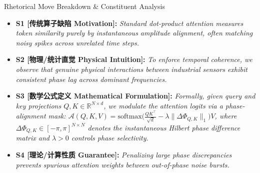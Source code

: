 \begin{TipBox}{Rhetorical Move Breakdown \& Constituent Analysis}
\begin{itemize}[leftmargin=1.5em]
  \item \textbf{S1 [传统算子缺陷 Motivation]:} \textit{Standard dot-product attention measures token similarity purely by instantaneous amplitude alignment, often matching noisy spikes across unrelated time steps.}\par{}
  \item \textbf{S2 [物理/统计直觉 Physical Intuition]:} \textit{To enforce temporal coherence, we observe that genuine physical interactions between industrial sensors exhibit consistent phase lag across dominant frequencies.}\par{}
  \item \textbf{S3 [数学公式定义 Mathematical Formulation]:} \textit{Formally, given query and key projections $Q, K \in \mathbb{R}^{N \times d}$, we modulate the attention logits via a phase-alignment mask: $\mathcal{A}(Q, K, V) = \text{softmax}\big(\frac{QK^\top}{\sqrt{d}} - \lambda \|\Delta \Phi_{Q,K}\|_1\big)V$, where $\Delta \Phi_{Q,K} \in [-\pi, \pi]^{N \times N}$ denotes the instantaneous Hilbert phase difference matrix and $\lambda > 0$ controls phase selectivity.}\par{}
  \item \textbf{S4 [理论/计算性质 Guarantee]:} \textit{Penalizing large phase discrepancies prevents spurious attention weights between out-of-phase noise bursts.}\par{}
\end{itemize}
\end{TipBox}
\medskip
